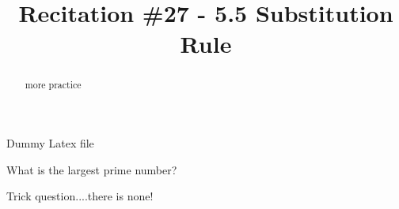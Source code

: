 \documentclass{ximera}
\title{Recitation \#27 - 5.5 Substitution Rule}
\begin{document}
\begin{abstract}    more practice		\end{abstract}
\maketitle

Dummy Latex file


\begin{question}
What is the largest prime number?
	\begin{freeResponse}
	Trick question....there is none!
	\end{freeResponse}
\end{question}






								
				
				
	
\end{document}
